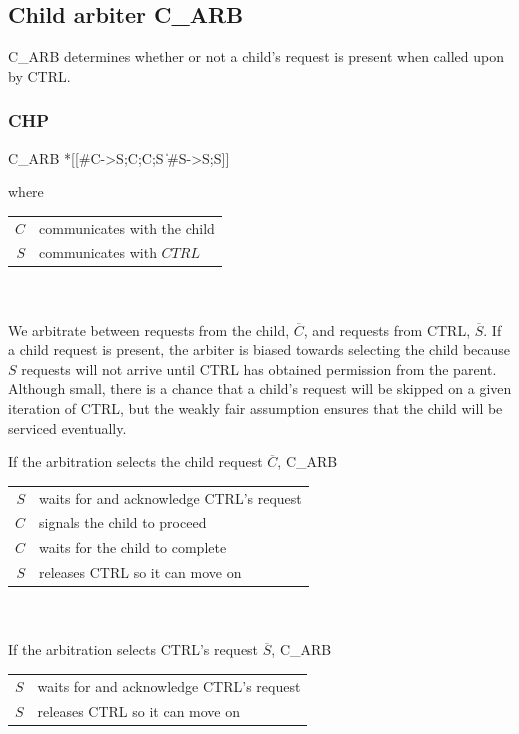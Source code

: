 \documentclass[aer.tex]{subfiles}
\begin{document}
\subsection{Child arbiter C\_ARB}
C\_ARB determines whether or not a child's request is present when called upon by CTRL.

\subsubsection*{CHP}

\begin{csp}
C_ARB\equiv
  *[[#C->S;C;C;S
    \|#S->S;S]]
\end{csp}

\noindent where 

\begin{tabular}[]{rl}
  $C$ & communicates with the child \\ 
  $S$ & communicates with $CTRL$ \\
\end{tabular} \\ \\

We arbitrate between requests from the child, $\overline{C}$, and 
requests from CTRL, $\overline{S}$. If a child request is present, the arbiter is biased towards selecting the child because $S$ requests will not arrive until CTRL has obtained permission from the parent. Although small, there is a chance that a child's request will be skipped on a given iteration of CTRL, but the weakly fair assumption ensures that the child will be serviced eventually.

\noindent If the arbitration selects the child request $\overline{C}$, C\_ARB

\begin{tabular}[]{rl}
  $S$ & waits for and acknowledge CTRL's request \\
  $C$ & signals the child to proceed \\
  $C$ & waits for the child to complete \\
  $S$ & releases CTRL so it can move on \\
\end{tabular} \\ \\

\noindent If the arbitration selects CTRL's request $\overline{S}$, C\_ARB

\begin{tabular}[]{rl}
  $S$ & waits for and acknowledge CTRL's request \\
  $S$ & releases CTRL so it can move on \\
\end{tabular} \\ \\
\end{document}
